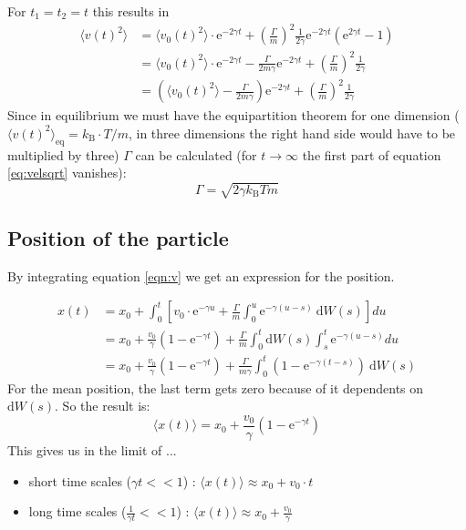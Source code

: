 \documentclass[12pt,a4paper]{scrartcl}
\begin{document}
For $t_1=t_2=t$ this results in
\begin{align}
	\langle v(t)^2\rangle &= \langle v_0(t)^2\rangle \cdot \text{e}^{-2\gamma t}+ \left( \frac{\Gamma}{m} \right)^2 \frac{1}{2 \gamma} \text{e}^ {-2\gamma t}\left( \text{e}^ {2\gamma t} - 1 \right)\\
	&=\langle v_0(t)^2\rangle \cdot \text{e}^{-2\gamma t} - \frac{\Gamma}{2 m\gamma} \text{e}^ {-2\gamma t} + \left( \frac{\Gamma}{m} \right)^2 \frac{1}{2 \gamma}\\
	&=\left( \langle v_0(t)^2\rangle - \frac{\Gamma}{2 m\gamma} \right) \text{e}^ {-2\gamma t} + \left( \frac{\Gamma}{m} \right)^2 \frac{1}{2 \gamma} \label{eq:velsqrt}
\end{align}
Since in equilibrium we must have the equipartition theorem for one dimension ($\langle v(t)^2\rangle_{\text{eq}} = k_\text{B} \cdot T / m$, in three dimensions the right hand side would have to be multiplied by three) $\Gamma$ can be calculated (for $t \rightarrow \infty$ the first part of equation \ref{eq:velsqrt} vanishes):
\begin{equation}
	\Gamma = \sqrt{2 \gamma k_\text{B} T m}
\end{equation}

\subsection{Position of the particle}

By integrating equation \ref{eqn:v} we get an expression for the position.

\begin{align}
x(t) &= x_0 +  \int_0^t \left[ v_0 \cdot \text{e}^{-\gamma u} + \frac{\Gamma}{m} \int_0^u \text{e}^ {-\gamma(u-s)}~\text{d}W(s) \right] du \\
&= x_0 + \frac{v_0}{\gamma} \left(1-\text{e}^{-\gamma t} \right) + \frac{\Gamma}{m} \int_0^t \text{d}W(s) \int_s^t \text{e}^{-\gamma (u-s)} du \\
&= x_0 + \frac{v_0}{\gamma} \left(1-\text{e}^{-\gamma t} \right) +\frac{\Gamma}{m \gamma} \int_0^t \left(1-\text{e}^{-\gamma (t-s)} \right) ~\text{d}W(s) \label{eqn:x}
\end{align}
For the mean position, the last term gets zero because of it dependents on $\text{d}W(s)$. So the result is:
\begin{equation}
\langle x(t) \rangle = x_0 + \frac{v_0}{\gamma} \left(1-\text{e}^{-\gamma t} \right)
\end{equation}
This gives us in the limit of ...
\begin{itemize}
\item short time scales ($\gamma t << 1$) : $\langle x(t) \rangle \approx x_0 + v_0 \cdot t$
\item long time scales ($\tfrac{1}{\gamma t} << 1$) : $\langle x(t) \rangle \approx x_0 + \frac{v_0}{\gamma}$
\end{itemize} \vspace{2em}
\end{document}
